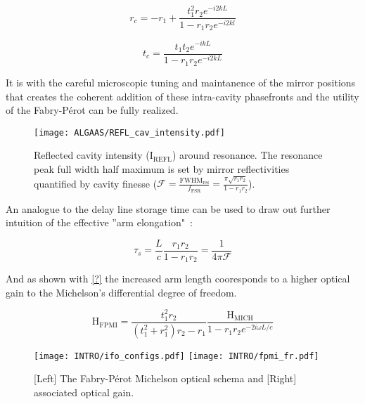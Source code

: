 \iffalse that the input and circulating that the photons belonging to a particular phasefront can be experimentally tracked, and lucky for us this is is why we measure interference at the anti-symmetric port. But these benefit
 with a constant source at the cavity input the phasefronts entering the cavity are superimposed onto the circulating cavity field and, more often than not, add incoherently which can makes this thought experiment seem silly.\fi 

\begin{equation}
	r_c = -r_1 + \frac{t^2_1r_2 e^{-i2kL}}{1-r_1 r_2 e^{-i2kl}}
\end{equation}

\begin{equation}
	t_c = \frac{t_1 t_2 e^{-ikL}}{1-r_1 r_2 e^{-i2kL}}	
\end{equation}

It is with the careful microscopic tuning and maintanence of the mirror positions that creates the coherent addition of these intra-cavity phasefronts and the utility of the Fabry-P\'{e}rot can be fully realized. 

\begin{figure}[H]
\texttt{[image: ALGAAS/REFL\_cav\_intensity.pdf]}
\caption{Reflected cavity intensity (I$_\mathrm{REFL}$) around resonance. The resonance peak full width half maximum is set by mirror reflectivities quantified by cavity finesse ($\mathscr{F} = \frac{\mathrm{FWHM}_\mathrm{res}}{f_\mathrm{FSR}} = \frac{\pi \sqrt{r_1 r_2}}{1-r_1 r_2}$).}
\label{fig:cav_length_response_DCpow}
\end{figure}

An analogue to the delay line storage time can be used to draw out further intuition of the effective ''arm elongation"~\cite{saulson2017}:

\begin{equation}
	\tau_s = \frac{L}{c} \frac{r_1r_2}{1-r_1r_2} = \frac{1}{4 \pi \mathscr{F}}
\end{equation}

And as shown with \ref{?} the increased arm length cooresponds to a higher optical gain to the Michelson's differential degree of freedom. 

\begin{equation}
	\mathrm{H_{FPMI}} = \frac{t_1 ^2 r_2}{(t_1^2 + r_1^2)r_2 - r_1} \frac{\mathrm{H_{MICH}}}{1 - r_1 r_2 e^{-2i \omega L / c}}
\end{equation}

\begin{figure}[ht!]
  \begin{subcaptiongroup}{\texttt{[image: INTRO/ifo\_configs.pdf]}}
  \texttt{[image: INTRO/fpmi\_fr.pdf]}
  \end{subcaptiongroup}
  \hfill
  \caption{[Left] The Fabry-P\'{e}rot Michelson optical schema and [Right] associated optical gain.}
  \label{fig:fpmi}
\end{figure}

